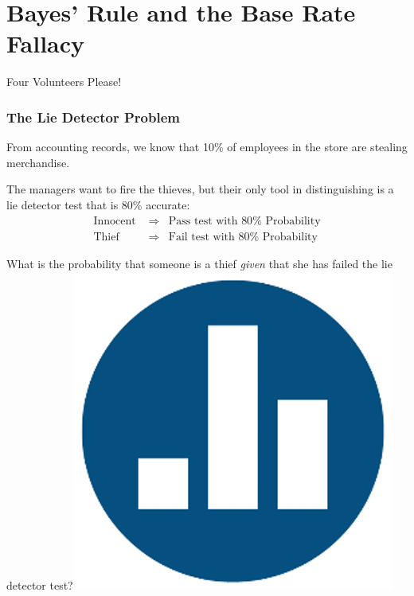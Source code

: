\def\EventA{(-0.35,0) circle (1.2)}
\def\EventB{(1.35,0) circle (1.2)}
\def\EventC{(-0.35,0) circle (0.6)}
\def\EventD{(0,0) circle (1.6)}
\def\SampleSpace{(-2,-2) rectangle (3,2)}
\section{Bayes' Rule and the Base Rate Fallacy}

\begin{frame}
\centering \Huge Four Volunteers Please!

\end{frame}
\begin{frame}
\frametitle{The Lie Detector Problem}
\begin{block}{From accounting records, we know that 10\% of employees in the store are stealing merchandise.}\end{block}
\begin{block}{The managers want to fire the thieves, but their only tool in distinguishing is a lie detector test that is 80\% accurate:}
	\begin{eqnarray*}
	\mbox{Innocent } &\Rightarrow& \mbox{Pass test with } 80\% \mbox{ Probability}\\
	\mbox{Thief } &\Rightarrow& \mbox{Fail test with } 80\% \mbox{ Probability}
	\end{eqnarray*}
\end{block}

\pause
\begin{alertblock}{What is the probability that someone is a thief \emph{given} that she has failed the lie detector test?\hfill\includegraphics[scale = 0.03]{./images/clicker} }
\end{alertblock}

\end{frame}

